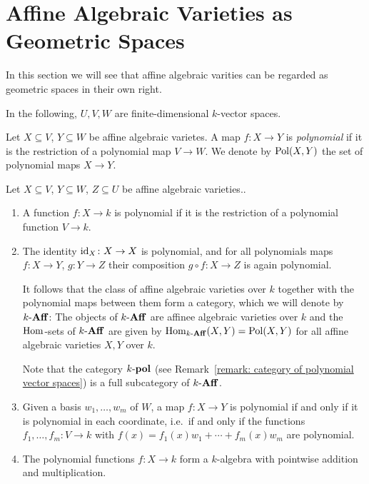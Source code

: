 \section{Affine Algebraic Varieties as Geometric Spaces}
\label{section: geometry of affine algebraic varietes}


\begin{fluff}
  In this section we will see that affine algebraic varities can be regarded as geometric spaces in their own right.
\end{fluff}


\begin{conventions}
  In the following, $U, V, W$ are finite-dimensional $k$-vector spaces.
\end{conventions}


\begin{definition}
  Let $X \subseteq V$, $Y \subseteq W$ be affine algebraic varietes.
  A map $f \colon X \to Y$ is \emph{polynomial} if it is the restriction of a polynomial map $V \to W$.
  We denote by $\operatorname{Pol}(X,Y)$ the set of polynomial maps $X \to Y$.
\end{definition}


\begin{remark}
  Let $X \subseteq V$, $Y \subseteq W$, $Z \subseteq U$ be affine algebraic varieties..
  \begin{enumerate}
    \item
      A function $f \colon X \to k$ is polynomial if it is the restriction of a polynomial function $V \to k$.
    \item
      The identity $\operatorname{id}_X \colon X \to X$ is polynomial, and for all polynomials maps $f \colon X \to Y$, $g \colon Y \to Z$ their composition $g \circ f \colon X \to Z$ is again polynomial.
      
      It follows that the class of affine algebraic varieties over $k$ together with the polynomial maps between them form a category, which we will denote by $k\text{-}\mathbf{Aff}$:
      The objects of $k\text{-}\mathbf{Aff}$ are affinee algebraic varieties over $k$ and the $\operatorname{Hom}$-sets of $k\text{-}\mathbf{Aff}$ are given by $\operatorname{Hom}_{k\text{-}\mathbf{Aff}}(X,Y) = \operatorname{Pol}(X,Y)$ for all affine algebraic varieties $X, Y$ over $k$.
      
      Note that the category $k\text{-}\mathbf{pol}$ (see Remark~\ref{remark: category of polynomial vector spaces}) is a full subcategory of $k\text{-}\mathbf{Aff}$.
    \item
      Given a basis $w_1, \dotsc, w_m$ of $W$, a map $f \colon X \to Y$ is polynomial if and only if it is polynomial in each coordinate, i.e.\ if and only if the functions $f_1, \dotsc, f_m \colon V \to k$ with $f(x) = f_1(x) w_1 + \dotsb + f_m(x) w_m$ are polynomial.
    \item
      The polynomial functions $f \colon X \to k$ form a $k$-algebra with pointwise addition and multiplication.
  \end{enumerate}
\end{remark}


